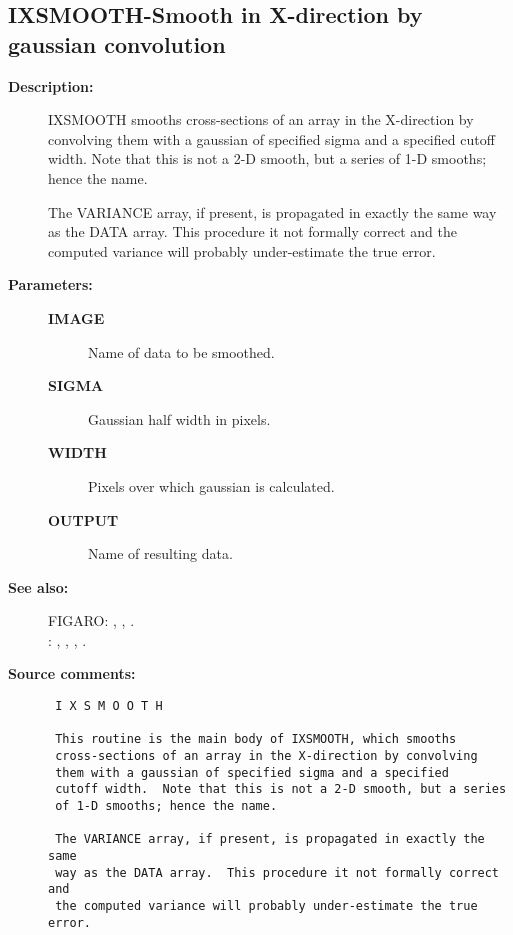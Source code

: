 \subsection{IXSMOOTH-\label{IXSMOOTH}Smooth in X-direction by gaussian convolution}
\begin{description}

\item [{\bf Description:}]
 IXSMOOTH smooths cross-sections of an array in the X-direction
 by convolving them with a gaussian of specified sigma and a
 specified cutoff width.  Note that this is not a 2-D smooth,
 but a series of 1-D smooths; hence the name.

 The VARIANCE array, if present, is propagated in exactly the same
 way as the DATA array.  This procedure it not formally correct and
 the computed variance will probably under-estimate the true error.

\item [{\bf Parameters:}]
\begin{description}
\item [{\bf IMAGE}]
 Name of data to be smoothed.
\item [{\bf SIGMA}]
 Gaussian half width in pixels.
\item [{\bf WIDTH}]
 Pixels over which gaussian is calculated.
\item [{\bf OUTPUT}]
 Name of resulting data.
\end{description}

\item [{\bf See also:}]
FIGARO: , , .\\
: , , , .\\

\item [{\bf Source comments:}]
\begin{verbatim}
 I X S M O O T H

 This routine is the main body of IXSMOOTH, which smooths
 cross-sections of an array in the X-direction by convolving
 them with a gaussian of specified sigma and a specified
 cutoff width.  Note that this is not a 2-D smooth, but a series
 of 1-D smooths; hence the name.

 The VARIANCE array, if present, is propagated in exactly the same
 way as the DATA array.  This procedure it not formally correct and
 the computed variance will probably under-estimate the true error.


\end{verbatim}
\end{description}
